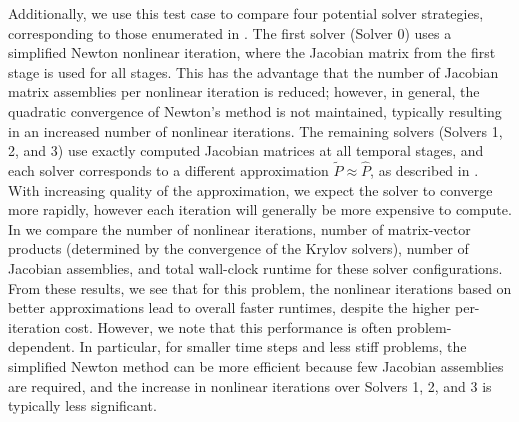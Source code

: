 \documentclass[review]{siamart}
\begin{document}
Additionally, we use this test case to compare four potential solver strategies,
corresponding to those enumerated in . The first solver
(Solver 0) uses a simplified Newton nonlinear iteration, where the Jacobian matrix
from the first stage is used for all stages. This has the advantage that the
number of Jacobian matrix assemblies per nonlinear iteration is reduced;
however, in general, the quadratic convergence of Newton's method is not
maintained, typically resulting in an increased number of nonlinear iterations.
The remaining solvers (Solvers 1, 2, and 3) use exactly computed Jacobian
matrices at all temporal stages, and each solver corresponds to a different
approximation $\tilde{P} \approx \widehat{P}$, as described in
. With increasing quality of the approximation, we
expect the solver to converge more rapidly, however each iteration will
generally be more expensive to compute. In  we
compare the number of nonlinear iterations, number of matrix-vector products
(determined by the convergence of the Krylov solvers), number of Jacobian
assemblies, and total wall-clock runtime for these solver configurations. From
these results, we see that for this problem, the nonlinear iterations based on
better approximations lead to overall faster runtimes, despite the higher
per-iteration cost. However, we note that this performance is often
problem-dependent. In particular, for smaller time steps and less stiff
problems, the simplified Newton method can be more efficient because few Jacobian
assemblies are required, and the increase in nonlinear iterations over
Solvers 1, 2, and 3 is typically less significant.
\end{document}
